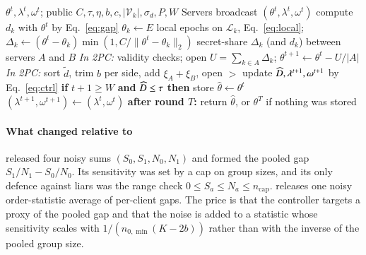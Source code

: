 \begin{algorithm}[t]
\caption{One round $t$ of \rt{}}\label{alg:rt}
\begin{algorithmic}[1]
\REQUIRE $\theta^t,\lambda^t,\omega^t$; public $C,\tau,\eta,b,c,|\mathcal{V}_k|,\sigma_d,P,W$
\STATE Servers broadcast $(\theta^t,\lambda^t,\omega^t)$
   \STATE compute $d_k$ with $\theta^t$ by Eq.~\eqref{eq:gap} \ENDIF
  \STATE $\theta_k\leftarrow E$ local epochs on $\mathcal{L}_k$, Eq.~\eqref{eq:local}; $\Delta_k\leftarrow(\theta^t-\theta_k)\min(1,C/\|\theta^t-\theta_k\|_2)$
  \STATE secret-share $\Delta_k$ (and $d_k$) between servers $A$ and $B$
\ENDFOR
\STATE \emph{In 2PC:} validity checks; open $U=\sum_{k\in A}\Delta_k$; $\theta^{t+1}\leftarrow\theta^t-U/|A|$
  \STATE \emph{In 2PC:} sort $\tilde d$, trim $b$ per side, add $\xi_A+\xi_B$, open $\gt$
  \STATE update $\widehat{D},\lambda^{t+1},\omega^{t+1}$ by Eq.~\eqref{eq:ctrl}
  \STATE \textbf{if} $t+1\ge W$ \textbf{and} $\widehat{D}\le\tau$ \textbf{then} store $\hat\theta\leftarrow\theta^t$
\ELSE \STATE $(\lambda^{t+1},\omega^{t+1})\leftarrow(\lambda^t,\omega^t)$ \ENDIF
\STATE \textbf{after round $T$:} return $\hat\theta$, or $\theta^T$ if nothing was stored
\end{algorithmic}
\end{algorithm}

\paragraph{What changed relative to \clamp{}}
\clamp{} released four noisy sums $(S_0,S_1,N_0,N_1)$ and formed the pooled gap $S_1/N_1-S_0/N_0$. Its sensitivity was set by a cap on group sizes, and its only defence against liars was the range check $0\le S_a\le N_a\le n_{\mathrm{cap}}$. \rt{} releases one noisy order-statistic average of per-client gaps. The price is that the controller targets a proxy of the pooled gap and that the noise is added to a statistic whose sensitivity scales with $1/(n_{0,\min}(K-2b))$ rather than with the inverse of the pooled group size.
